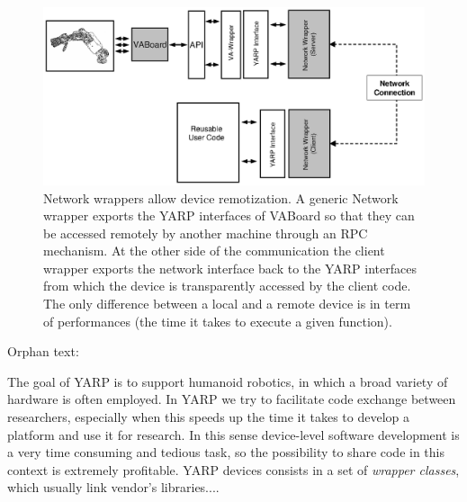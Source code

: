 \begin{figure}[tbp]
\centerline{
\includegraphics[width=24cm]{fig-devices3}
}
\caption{Network wrappers allow device remotization. A generic Network 
wrapper exports the YARP interfaces of VABoard so that they can be 
accessed remotely by another machine through an RPC mechanism. At the 
other side of the 
communication the client wrapper exports the network interface back 
to the YARP interfaces from which the device is transparently accessed 
by the client code. The only difference between a local and a 
remote device is in term of performances (the time it takes to execute 
a given function).
}\label{fig:devices3}
\end{figure}

Orphan text:

The goal of YARP is to support humanoid robotics, in which a broad 
variety of hardware is often employed. In YARP we try to facilitate code 
exchange between researchers, especially when this speeds up the time 
it takes to develop a platform and use it for research. In this sense 
device-level software development is a very time consuming and tedious 
task, so the possibility to share code in this context is extremely 
profitable. YARP devices consists in a set of \emph{wrapper classes}, 
which usually link vendor's libraries.... 


